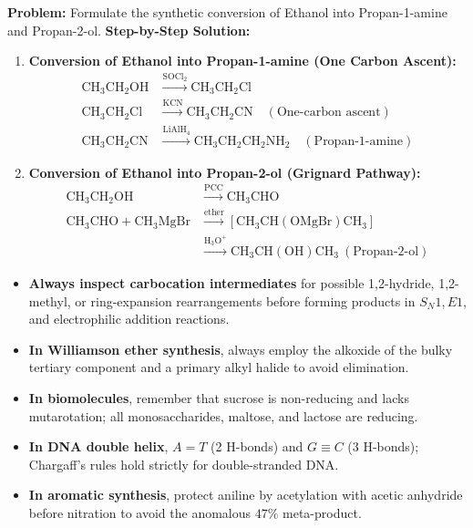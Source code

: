 \documentclass[10pt,twoside,openright]{book}
\begin{document}
\begin{usecasebox}
\textbf{Problem:} Formulate the synthetic conversion of Ethanol into Propan-1-amine and Propan-2-ol.
\textbf{Step-by-Step Solution:}
\begin{enumerate}[leftmargin=*]
  \item \textbf{Conversion of Ethanol into Propan-1-amine (One Carbon Ascent):}
  \begin{align}
    \mathrm{CH_3CH_2OH} &\xrightarrow{\mathrm{SOCl_2}} \mathrm{CH_3CH_2Cl} \\
    \mathrm{CH_3CH_2Cl} &\xrightarrow{\mathrm{KCN}} \mathrm{CH_3CH_2CN} \quad (\text{One-carbon ascent})\\
    \mathrm{CH_3CH_2CN} &\xrightarrow{\mathrm{LiAlH_4}} \mathbf{\mathrm{CH_3CH_2CH_2NH_2}} \quad (\text{Propan-1-amine})
  \end{align}
  \item \textbf{Conversion of Ethanol into Propan-2-ol (Grignard Pathway):}
  \begin{align}
    \mathrm{CH_3CH_2OH} &\xrightarrow{\mathrm{PCC}} \mathrm{CH_3CHO} \\
    \mathrm{CH_3CHO} + \mathrm{CH_3MgBr} &\xrightarrow{\text{ether}} [\mathrm{CH_3CH(OMgBr)CH_3}] \\
    &\xrightarrow{\mathrm{H_3O^+}} \mathbf{\mathrm{CH_3CH(OH)CH_3}} \ (\text{Propan-2-ol})
  \end{align}
\end{enumerate}
\end{usecasebox}

\begin{conceptbox}
\begin{itemize}
  \item \textbf{Always inspect carbocation intermediates} for possible 1,2-hydride, 1,2-methyl, or ring-expansion rearrangements before forming products in $S_N1, E1$, and electrophilic addition reactions.
  \item \textbf{In Williamson ether synthesis}, always employ the alkoxide of the bulky tertiary component and a primary alkyl halide to avoid elimination.
  \item \textbf{In biomolecules}, remember that sucrose is non-reducing and lacks mutarotation; all monosaccharides, maltose, and lactose are reducing.
  \item \textbf{In DNA double helix}, $A=T$ (2 H-bonds) and $G\equiv C$ (3 H-bonds); Chargaff's rules hold strictly for double-stranded DNA.
  \item \textbf{In aromatic synthesis}, protect aniline by acetylation with acetic anhydride before nitration to avoid the anomalous $47\%$ meta-product.
\end{itemize}
\end{conceptbox}
\end{document}
